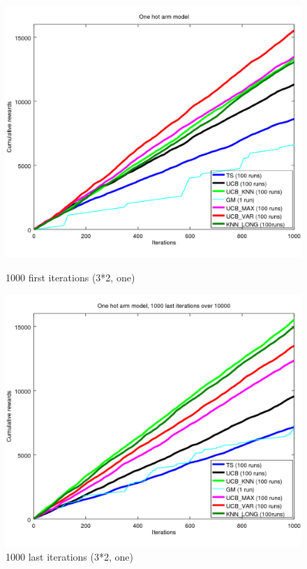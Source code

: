 \documentclass{article} %
\begin{document}
\begin{figure}[h]
	\begin{minipage}[b]{.49\linewidth}
		\includegraphics[width=1.0\textwidth]{begin_1000it.png}
		\caption{1000 first iterations (3*2, one)}
	\end{minipage}
	\hfill
	\begin{minipage}[b]{0.49\linewidth}
		\includegraphics[width=1.0\textwidth]{last_1000it.png}
		\caption{1000 last iterations (3*2, one)}
	\end{minipage}
	\label{fig:f}
\end{figure}
\end{document}

